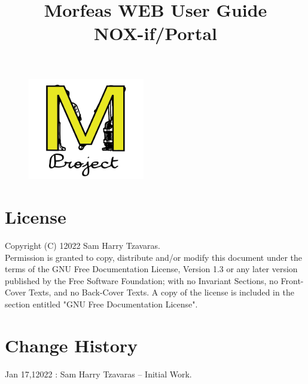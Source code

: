 \documentclass{article}
\title{Morfeas WEB User Guide\\NOX-if/Portal}
\author{}
\date{}
\begin{document}
\clearpage
\begin{figure}
\centering
  \includegraphics[width=2in]{../../Morfeas_WEB/art/Morfeas_logo_yellow.png}
\end{figure}
\maketitle
\thispagestyle{empty}
\newpage
\section{License}
Copyright (C)  12022  Sam Harry Tzavaras.\\
Permission is granted to copy, distribute and/or modify this document
under the terms of the GNU Free Documentation License, Version 1.3
or any later version published by the Free Software Foundation;
with no Invariant Sections, no Front-Cover Texts, and no Back-Cover Texts.
A copy of the license is included in the section entitled "GNU Free Documentation License".

\section{Change History}
Jan 17,12022 : Sam Harry Tzavaras -- Initial Work.

\newpage
\tableofcontents
\listoffigures
\newpage



\end{document}
